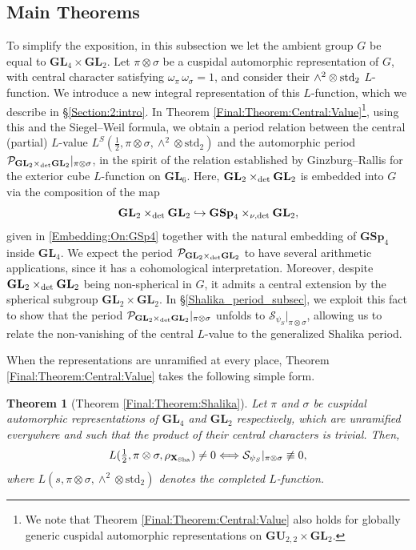 \documentclass[11pt, reqno]{amsart}
\theoremstyle{plain}
\theoremstyle{definition}
\theoremstyle{remark}
\theoremstyle{plain}
\newtheorem{thma}{Theorem}
\def\GSp{{\mathbf{GSp}}}
\def\GU{{\mathbf{GU}}}
\def\GL{\mathbf{GL}}
\begin{document}
\subsection{Main Theorems}
 To simplify the exposition, in this subsection we let the ambient group $G$ be equal to $\GL_4 \times \GL_2$. Let $\pi \otimes \sigma$ be a cuspidal automorphic representation of $G$, with central character satisfying $\omega_\pi \, \omega_\sigma = 1$, and consider their $\wedge^2 \otimes {\rm std}_2$ $L$-function.  We introduce a new integral representation of this $L$-function, which we describe in \S \ref{Section:2:intro}. In Theorem \ref{Final:Theorem:Central:Value}\footnote{We note that Theorem \ref{Final:Theorem:Central:Value} also holds for globally generic cuspidal automorphic representations on $\GU_{2,2} \times \GL_2$.}, using this and the Siegel--Weil formula, we obtain a period relation between the central (partial) $L$-value $L^S(\tfrac{1}{2},\pi\otimes\sigma,\wedge^2\otimes\mathrm{std}_2)$ and the automorphic period $\mathcal{P}_{\GL_2 \times_{\rm det} \GL_2}|_{\pi\otimes\sigma}$, in the spirit of the relation established by Ginzburg--Rallis \cite{GinzburgRallis} for the exterior cube $L$-function on $\GL_6$. Here, $\GL_2 \times_{\rm det} \GL_2$ is embedded into $G$ via the composition of the map $$\GL_2 \times_{\rm det} \GL_2 \hookrightarrow \GSp_4  \times_{\nu,{\rm det}} \GL_2,$$ given in \eqref{Embedding:On:GSp4} together with the natural embedding of $\GSp_4$ inside $\GL_4$. We expect the period $\mathcal{P}_{\GL_2 \times_{\rm det} \GL_2}$ to have several arithmetic applications, since it has a cohomological interpretation. Moreover, despite $\GL_2 \times_{\rm det} \GL_2$ being non-spherical in $G$, it admits a central extension by the spherical subgroup $\GL_2 \times \GL_2$. In \S \ref{Shalika_period_subsec}, we exploit this fact to show that the period $\mathcal{P}_{\GL_2 \times_{\rm det} \GL_2}|_{\pi\otimes\sigma}$ unfolds to $\mathcal{S}_{\psi_S}|_{\pi \otimes \sigma}$, allowing us to relate the non-vanishing of the central $L$-value to the generalized Shalika period. 

 When the representations are unramified at every place, Theorem \ref{Final:Theorem:Central:Value} takes the following simple form.

\begin{thma}[{Theorem \ref{Final:Theorem:Shalika}}]\label{Thma}
Let $\pi$ and $\sigma$ be cuspidal automorphic representations of $\GL_4$ and $\GL_2$ respectively, which are unramified everywhere and such that the product of their central characters is trivial. Then,
        \[L(\tfrac{1}{2},\pi \otimes \sigma,\rho_{\mathbf{X}_{\rm Sha}})\neq 0 \Longleftrightarrow \mathcal{S}_{\psi_S}|_{\pi \otimes \sigma} \not \equiv 0,  \]
        where $L(s, \pi \otimes \sigma, \wedge^2 \otimes  \mathrm{std}_2)$ denotes the completed $L$-function. 
\end{thma}
\end{document}
